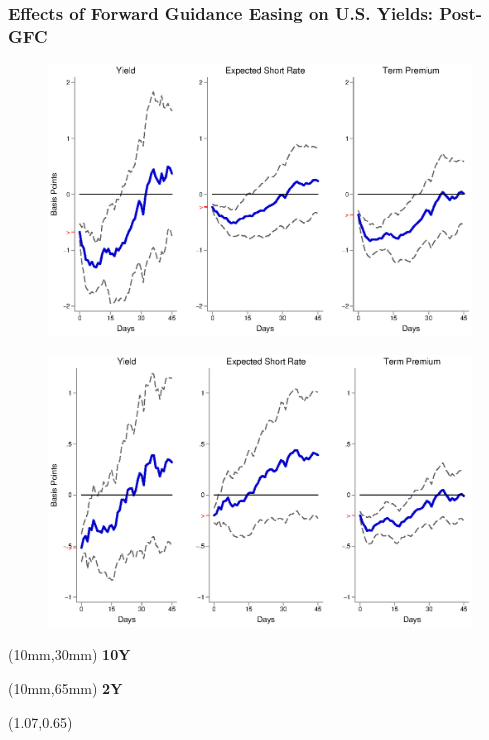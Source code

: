 \documentclass[12pt, aspectratio=169, xcolor=dvipsnames]{beamer}
\begin{document}
\begin{frame}[label=FGUSpost]
\frametitle{Effects of Forward Guidance Easing on U.S. Yields: Post-GFC}
\begin{figure}[!htbp]
\begin{center} %
\includegraphics[trim={0cm 0cm 0cm 0cm},clip,height=0.45\textheight,width=0.85\linewidth]{../Figures/LPs/LagDep-FX/Path/US/DCMP/PathUSDnomyptp120mPost.eps}
\par\end{center}
\end{figure}
\vspace{-0.5cm}
\begin{figure}[!htbp]
\begin{center} %
\includegraphics[trim={0cm 0cm 0cm 0.76cm},clip,height=0.45\textheight,width=0.85\linewidth]{../Figures/LPs/LagDep-FX/Path/US/DCMP/PathUSDnomyptp24mPost.eps}
\par\end{center}
\end{figure}
\begin{textblock*}{8mm}(10mm,30mm)
\small \textbf{10Y}
\end{textblock*}
\begin{textblock*}{8mm}(10mm,65mm)
\small \textbf{2Y}
\end{textblock*}
\begin{textblock*}{5cm}(1.07\textwidth,0.65\textheight)
\hyperlink{FGEMpost}{}
\end{textblock*}
\end{frame}
\end{document}
